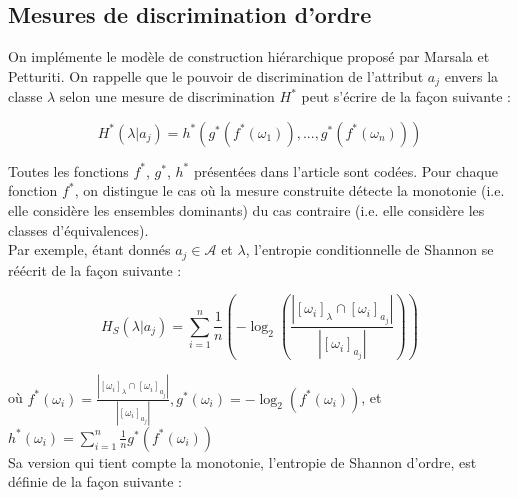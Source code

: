 \documentclass[a4paper]{article}
\begin{document}
%
%
%
%

\subsection{Mesures de discrimination d'ordre} 
On implémente le modèle de
construction hiérarchique proposé par Marsala et Petturiti. On rappelle que le
pouvoir de discrimination de l'attribut $a_j$ envers la classe $\lambda$ selon
une mesure de discrimination $H^*$ peut s'écrire de la façon suivante :

$$ H^*(\lambda | a_j) = h^*(g^*(f^*(\omega_1)),...,g^*(f^*(\omega_n)))$$

\noindent Toutes les fonctions $f^*$, $g^*$, $h^*$ présentées dans l'article
sont codées.  Pour chaque fonction $f^*$, on distingue le cas où la mesure
construite détecte la monotonie (i.e. elle considère les ensembles dominants) du
cas contraire (i.e.  elle considère les classes d'équivalences). \\

Par exemple, étant donnés $a_j \in \mathcal{A}$ et $\lambda$, l'entropie
conditionnelle de Shannon se réécrit de la façon suivante :

$$ H_S(\lambda | a_j) = \sum_{i=1}^{n} \frac{1}{n} (-\log_{2} (\frac{|[\omega_i]_{\lambda} \cap
[\omega_i]_{a_j}|}{|[\omega_i]_{a_j}|}))$$

où $f^*(\omega_i) = \frac{|[\omega_i]_{\lambda} \cap
[\omega_i]_{a_j}|}{|[\omega_i]_{a_j}|}, g^*(\omega_i) = -\log_{2}
(f^*(\omega_i))$, et $h^*(\omega_i) = \sum_{i=1}^{n} \frac{1}{n}
g^*(f^*(\omega_i))$ \\

Sa version qui tient compte la monotonie, l'entropie de Shannon d'ordre, est
définie de la façon suivante :
\end{document}
